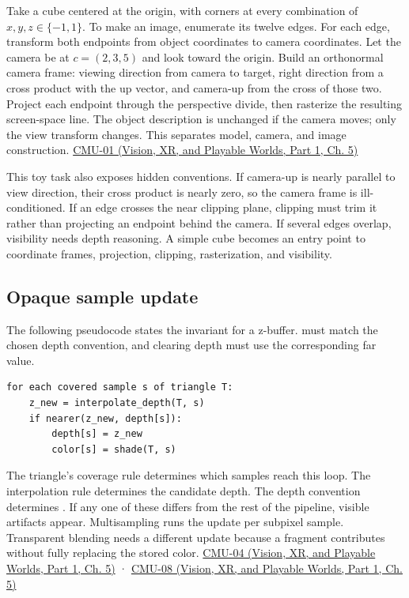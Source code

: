 \hypertarget{03-visual-computing-i-ch015-a-cube-drawing-pipeline}{}

Take a cube centered at the origin, with corners at every combination of \(x,y,z\in\{-1,1\}\). To make an image, enumerate its twelve edges. For each edge, transform both endpoints from object coordinates to camera coordinates. Let the camera be at \(c=(2,3,5)\) and look toward the origin. Build an orthonormal camera frame: viewing direction from camera to target, right direction from a cross product with the up vector, and camera-up from the cross of those two. Project each endpoint through the perspective divide, then rasterize the resulting screen-space line. The object description is unchanged if the camera moves; only the view transform changes. This separates model, camera, and image construction. \href{../07-Vision-XR-and-Playable-Worlds-P01/main.pdf\#nameddest=04-visual-computing-ii-ch036-cmu-01---course-overview}{CMU-01 (Vision, XR, and Playable Worlds, Part 1, Ch. 5)}

This toy task also exposes hidden conventions. If camera-up is nearly parallel to view direction, their cross product is nearly zero, so the camera frame is ill-conditioned. If an edge crosses the near clipping plane, clipping must trim it rather than projecting an endpoint behind the camera. If several edges overlap, visibility needs depth reasoning. A simple cube becomes an entry point to coordinate frames, projection, clipping, rasterization, and visibility.

\subsection{Opaque sample update}\label{03-visual-computing-i-ch015-opaque-sample-update}

\hypertarget{03-visual-computing-i-ch015-opaque-sample-update}{}

The following pseudocode states the invariant for a z-buffer.  must match the chosen depth convention, and clearing depth must use the corresponding far value.

\begin{verbatim}
for each covered sample s of triangle T:
    z_new = interpolate_depth(T, s)
    if nearer(z_new, depth[s]):
        depth[s] = z_new
        color[s] = shade(T, s)
\end{verbatim}

The triangle's coverage rule determines which samples reach this loop. The interpolation rule determines the candidate depth. The depth convention determines . If any one of these differs from the rest of the pipeline, visible artifacts appear. Multisampling runs the update per subpixel sample. Transparent blending needs a different update because a fragment contributes without fully replacing the stored color. \href{../07-Vision-XR-and-Playable-Worlds-P01/main.pdf\#nameddest=04-visual-computing-ii-ch036-cmu-04---drawing-a-triangle-and-an-intro-to-sampling}{CMU-04 (Vision, XR, and Playable Worlds, Part 1, Ch. 5)} · \href{../07-Vision-XR-and-Playable-Worlds-P01/main.pdf\#nameddest=04-visual-computing-ii-ch036-cmu-08---depth-and-transparency}{CMU-08 (Vision, XR, and Playable Worlds, Part 1, Ch. 5)}

